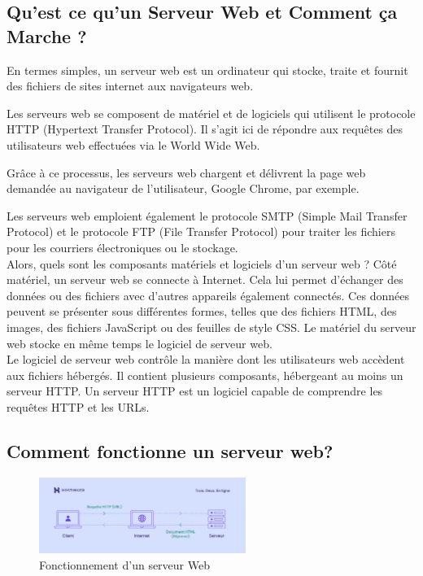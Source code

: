 \subsection{Qu’est ce qu’un Serveur Web et Comment ça Marche ?}
En termes simples, un serveur web est un ordinateur qui stocke, traite et fournit des fichiers de sites internet aux navigateurs web.

Les serveurs web se composent de matériel et de logiciels qui utilisent le protocole HTTP (Hypertext Transfer Protocol). Il s’agit ici de répondre aux requêtes des utilisateurs web effectuées via le World Wide Web.

Grâce à ce processus, les serveurs web chargent et délivrent la page web demandée au navigateur de l’utilisateur, Google Chrome, par exemple.

Les serveurs web emploient également le protocole SMTP (Simple Mail Transfer Protocol) et le protocole FTP (File Transfer Protocol) pour traiter les fichiers pour les courriers électroniques ou le stockage.\\

Alors, quels sont les composants matériels et logiciels d’un serveur web ? Côté matériel, un serveur web se connecte à Internet. Cela lui permet d’échanger des données ou des fichiers avec d’autres appareils également connectés. Ces données peuvent se présenter sous différentes formes, telles que des fichiers HTML, des images, des fichiers JavaScript ou des feuilles de style CSS. Le matériel du serveur web stocke en même temps le logiciel de serveur web.\\

Le logiciel de serveur web contrôle la manière dont les utilisateurs web accèdent aux fichiers hébergés. Il contient plusieurs composants, hébergeant au moins un serveur HTTP. Un serveur HTTP est un logiciel capable de comprendre les requêtes HTTP et les URLs.\\
\subsection{Comment fonctionne un serveur web?}

\begin{figure}[h]
	\begin{center}
	\includegraphics[width=0.6\textwidth]{PhotoMemoire/serveurweb_fonct.jpg}
\end{center}
	\caption{Fonctionnement d'un serveur Web }
	
\end{figure}


